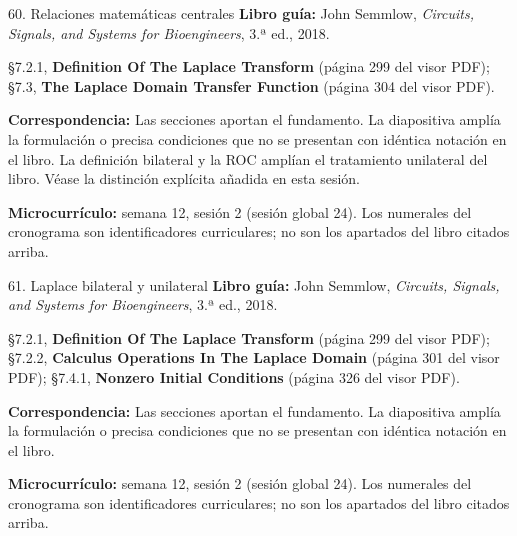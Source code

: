 \documentclass[
  10pt,
  ignorenonframetext,
  aspectratio=169,
  spanish,
]{beamer}
\begin{document}
\begin{frame}{60. Relaciones matemáticas centrales}
\label{relaciones-matemuxe1ticas-centrales-3}
\textbf{Libro guía:} John Semmlow, \emph{Circuits, Signals, and Systems
for Bioengineers}, 3.ª ed., 2018.

§7.2.1, \textbf{Definition Of The Laplace Transform} (página 299 del
visor PDF); §7.3, \textbf{The Laplace Domain Transfer Function} (página
304 del visor PDF).

\textbf{Correspondencia:} Las secciones aportan el fundamento. La
diapositiva amplía la formulación o precisa condiciones que no se
presentan con idéntica notación en el libro. La definición bilateral y
la ROC amplían el tratamiento unilateral del libro. Véase la distinción
explícita añadida en esta sesión.

\textbf{Microcurrículo:} semana 12, sesión 2 (sesión global 24). Los
numerales del cronograma son identificadores curriculares; no son los
apartados del libro citados arriba.
\end{frame}

\begin{frame}{61. Laplace bilateral y unilateral}
\label{laplace-bilateral-y-unilateral}
\textbf{Libro guía:} John Semmlow, \emph{Circuits, Signals, and Systems
for Bioengineers}, 3.ª ed., 2018.

§7.2.1, \textbf{Definition Of The Laplace Transform} (página 299 del
visor PDF); §7.2.2, \textbf{Calculus Operations In The Laplace Domain}
(página 301 del visor PDF); §7.4.1, \textbf{Nonzero Initial Conditions}
(página 326 del visor PDF).

\textbf{Correspondencia:} Las secciones aportan el fundamento. La
diapositiva amplía la formulación o precisa condiciones que no se
presentan con idéntica notación en el libro.

\textbf{Microcurrículo:} semana 12, sesión 2 (sesión global 24). Los
numerales del cronograma son identificadores curriculares; no son los
apartados del libro citados arriba.
\end{frame}
\end{document}
